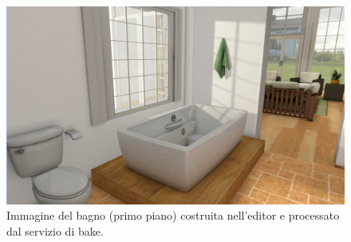 \\
\begin{figure}[htb]
 \centering
 \includegraphics[width=1\linewidth]{images/chapter_prove_sperimentali/scena_bagno.png}\hfill
 \caption[Ambiente virtuale: Bagno primo piano]{Immagine del bagno (primo piano) costruita nell'editor e processato dal servizio di bake.}
 \label{fig:prove_sperimentali_qualita_visiva_scena_hobby}
\end{figure}

